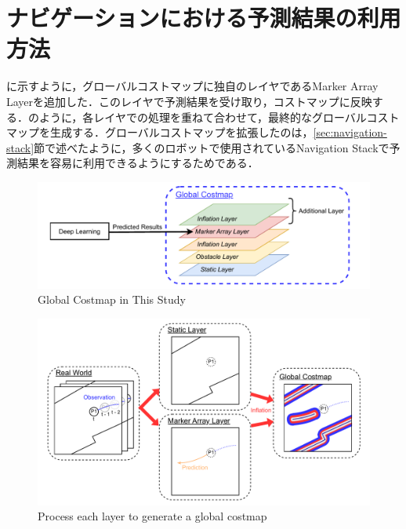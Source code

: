 \section{ナビゲーションにおける予測結果の利用方法}\label{sec:nav-usage}
に示すように，グローバルコストマップに独自のレイヤであるMarker Array Layerを追加した．このレイヤで予測結果を受け取り，コストマップに反映する．のように，各レイヤでの処理を重ねて合わせて，最終的なグローバルコストマップを生成する．グローバルコストマップを拡張したのは，\ref{sec:navigation-stack}節で述べたように，多くのロボットで使用されているNavigation Stackで予測結果を容易に利用できるようにするためである．

\begin{figure}[H]
  \centering
 \includegraphics[keepaspectratio, scale=0.7]
      {images/layer.pdf}
\caption{Global Costmap in This Study}
 \label{Fig:global-costmap}
\end{figure} 

\begin{figure}[H]
  \centering
 \includegraphics[keepaspectratio, scale=0.47]
      {images/costmap-image.pdf}
\caption{Process each layer to generate a global costmap}
 \label{Fig:costmap-flow}
\end{figure} 


\newpage
